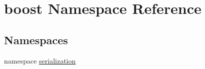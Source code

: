 \hypertarget{namespaceboost}{
\section{boost Namespace Reference}
\label{namespaceboost}
}
\subsection*{Namespaces}
\begin{DoxyCompactItemize}
\item 
namespace \hyperlink{namespaceboost_1_1serialization}{serialization}
\end{DoxyCompactItemize}
